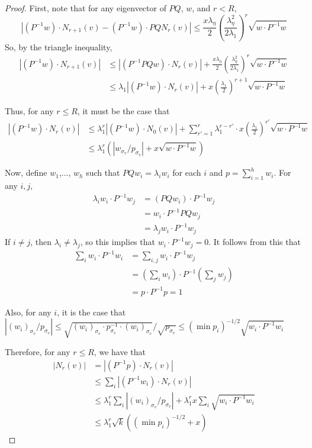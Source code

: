 \documentclass[11pt]{article}
\newcommand{\1}{\mathbb{1}}
\begin{document}
\begin{proof}
First, note that for any eigenvector of $PQ$, $w$, and $r<R$, \[|(P^{-1}w)\cdot N_{r+1}(v)-(P^{-1}w)\cdot PQN_r(v)|\le \frac{x\lambda_{\eta}}{2}\left(\frac{\lambda_{\eta}^2}{2\lambda_1}\right)^{r}\sqrt{w\cdot P^{-1}w}\] So, by the triangle inequality,
\begin{align*}
|(P^{-1}w)\cdot N_{r+1}(v)|&\le |(P^{-1} PQw)\cdot N_r(v)|+\frac{x\lambda_{\eta}}{2}\left(\frac{\lambda_{\eta}^2}{2\lambda_1}\right)^{r}\sqrt{w\cdot P^{-1}w}\\
&\le \lambda_1|(P^{-1}w)\cdot N_r(v)|+x\left(\frac{\lambda_1}{2}\right)^{r+1}\sqrt{w\cdot P^{-1}w}
\end{align*}

Thus, for any $r\le R$, it must be the case that 
\begin{align*}
|(P^{-1}w)\cdot N_r(v)|&\le \lambda_1^r|(P^{-1}w)\cdot N_0(v)|+\sum_{r'=1}^{r} \lambda_1^{r-r'}\cdot x\left(\frac{\lambda_1}{2}\right)^{r'}\sqrt{w\cdot P^{-1}w}\\
&\le \lambda_1^r\left (|w_{\sigma_v}/p_{\sigma_v}|+x\sqrt{w\cdot P^{-1}w}\right)
\end{align*}

Now, define $w_1$,..., $w_h$ such that $PQw_i=\lambda_iw_i$ for each $i$ and $p=\sum_{i=1}^h w_i$. For any $i,j$, 
\begin{align*}
\lambda_iw_i\cdot P^{-1}w_j&=(PQw_i)\cdot P^{-1}w_j\\
&=w_i\cdot P^{-1}PQw_j\\
&=\lambda_jw_i\cdot P^{-1}w_j
\end{align*}
If $i\ne j$, then $\lambda_i\ne \lambda_j$, so this implies that $w_i\cdot P^{-1} w_j=0$. It follows from this that
\begin{align*}
\sum_i w_i\cdot P^{-1} w_i&=\sum_{i,j} w_i\cdot P^{-1}w_j\\
&= \left(\sum_i w_i\right)\cdot P^{-1}\left(\sum_j w_j\right)\\
&=p\cdot P^{-1} p=1
\end{align*}

Also, for any $i$, it is the case that $|(w_i)_{\sigma_v}/p_{\sigma_v}|\le \sqrt{(w_i)_{\sigma_v}\cdot p^{-1}_{\sigma_v}\cdot (w_i)_{\sigma_v}}/\sqrt{p_{\sigma_v}}\le (\min p_i)^{-1/2}\sqrt{w_i\cdot P^{-1}w_i}$

Therefore, for any $r\le R$, we have that
\begin{align*}
|N_r(v)|&=|(P^{-1}p)\cdot N_r(v)|\\
&\le \sum_i |(P^{-1} w_i)\cdot N_r(v)|\\
&\le \lambda_1^r\sum_i |(w_i)_{\sigma_v}/p_{\sigma_v}|+\lambda_1^r x\sum_i \sqrt{w_i\cdot P^{-1}w_i}\\
&\le \lambda_1^r\sqrt{k}((\min p_i)^{-1/2}+x)
\end{align*}

\end{proof}
\end{document}
